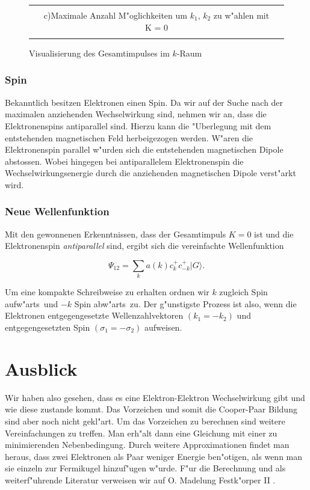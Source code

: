 \begin{refsection}
\begin{figure}
\begin{tabular}{l c l}
\begin{minipage}{0.6\textwidth}
    \end{minipage}
    \\
    &
    c)\quad Maximale Anzahl M"oglichkeiten um $k_1$, $k_2$ zu w"ahlen mit K = 0
    \\
    \\
  \end{tabular}
  \caption{Visualisierung des Gesamtimpulses im $k$-Raum
  \label{supraleitung:kRaum}}
\end{figure}

\subsubsection{Spin}
Bekanntlich besitzen Elektronen einen Spin.
Da wir auf der Suche nach der maximalen anziehenden Wechselwirkung sind, nehmen wir an,
dass die Elektronenspins antiparallel sind.
Hierzu kann die "Uberlegung mit dem entstehenden magnetischen Feld herbeigezogen werden.
W"aren die Elektronenspin parallel w"urden sich die entstehenden magnetischen Dipole abstossen.
Wobei hingegen bei antiparallelem Elektronenspin die Wechselwirkungsenergie durch die
anziehenden magnetischen Dipole verst"arkt wird.

\subsubsection{Neue Wellenfunktion}
Mit den gewonnenen Erkenntnissen, dass der Gesamtimpuls $K=0$ ist und die Elektronenspin
{\em antiparallel} sind, ergibt sich die vereinfachte Wellenfunktion

\[
\Psi_{12}=\sum \limits_{k} a(k)c^+_{k}c^+_{-k}|G\rangle.
\]

Um eine kompakte Schreibweise zu erhalten ordnen wir $k$ zugleich \glqq Spin
aufw"arts\grqq~und $-k$ \glqq Spin abw"arts\grqq~zu.
Der g"unstigste Prozess ist also, wenn die Elektronen entgegengesetzte
Wellenzahlvektoren $(k_1 = -k_2)$ und entgegengesetzten Spin $(\sigma_1 = -\sigma_2)$ aufweisen.

\section{Ausblick}
Wir haben also gesehen, dass es eine Elektron-Elektron Wechselwirkung gibt und wie diese zustande kommt.
Das Vorzeichen und somit die Cooper-Paar Bildung sind aber noch nicht gekl"art.
Um das Vorzeichen zu berechnen sind weitere Vereinfachungen zu treffen.
Man erh"alt dann eine Gleichung mit einer zu minimierenden Nebenbedingung.
Durch weitere Approximationen findet man heraus,
dass zwei Elektronen als Paar weniger Energie ben"otigen, als wenn man sie einzeln zur Fermikugel
hinzuf"ugen w"urde.
F"ur die Berechnung und als weiterf"uhrende Literatur verweisen wir auf
O. Madelung Festk"orper II \cite{supraleitung:madelung1}.

\printbibliography[heading=subbibliography]
\end{refsection}
